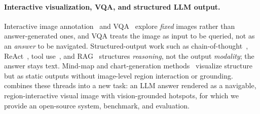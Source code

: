 \paragraph{Interactive visualization, VQA, and structured LLM output.}
Interactive image annotation~\citep{hochheiser2004interactive,munzner2014visualization}
and VQA~\citep{antol2015vqa,goyal2017vqav2,mathew2021docvqa,masry2022chartqa}
explore \emph{fixed} images rather than answer-generated ones, and VQA treats
the image as input to be queried, not as an \emph{answer} to be navigated.
Structured-output work such as chain-of-thought~\citep{wei2022cot},
ReAct~\citep{yao2023react}, tool use~\citep{schick2023toolformer},
and RAG~\citep{lewis2020rag,gao2024ragsurvey} structures \emph{reasoning}, not
the output \emph{modality}; the answer stays text. Mind-map and
chart-generation methods~\citep{zhang2014mindmap,hu2024llmmindmap,obeid2020charttotext,tang2023chartlama}
visualize structure but as static outputs without image-level region interaction
or grounding. \method{} combines these threads into a new task: an LLM answer
rendered as a navigable, region-interactive visual image with vision-grounded
hotspots, for which we provide an open-source system, benchmark, and evaluation.
